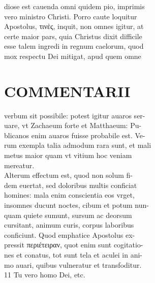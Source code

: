 \documentclass{article}
\begin{document}
\begin{pages}
                diose est cauenda omni quidem pio, imprimis \\
                vero ministro Christi. Porro caute loquitur \\
                Apostolus, τινὲς, inquit, non omnes igitur, at \\
                certe maior pars, quia Christus dixit difficile \\
                esse talem ingredi in regnum caelorum, quod \\
                mox respectu Dei mitigat, apud quem omne \\
                
\section*{COMMENTARII \\
                }verbum sit possibile: potest igitur auaros ser- \\
                uare, vt Zachaeum forte et Matthaeum: Pu- \\
                blicanos enim auaros fuisse probabile est. Ve- \\
                rum exempla talia admodum rara sunt, et mali \\
                metus maior quam vt vitium hoc veniam \\
                mereatur. \\
                Alterum effectum est, quod non solum fi- \\
                dem euertat, sed doloribus multis conficiat \\
                homines: mala enim conscientia eos vrget, \\
                insomnes ducunt noctes, cibum et potum nun- \\
                quam quiete sumunt, sursum ac deorsum \\
                cursitant, animum curis, corpus laboribus \\
                conficiunt. Quod emphatice Apostolus ex- \\
                pressit περιέτειραν, quot enim sunt cogitatio- \\
                nes et conatus, tot sunt tela et aculei in ani- \\
                mo auari, quibus vulneratur et transfoditur. \\
                11 Tu vero homo Dei, etc. \\

\end{pages}
\end{document}

